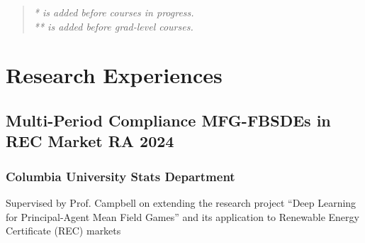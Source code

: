 \documentclass[a4paper]{article}
\begin{document}
\begin{quote}
    \itshape
    * is added before courses in progress.\\
    ** is added before grad-level courses.
\end{quote}

\section{Research Experiences}  %

\hypertarget{FBSDEs}{
    \subsection{Multi-Period Compliance MFG-FBSDEs in REC Market \normalfont \hfill RA \hfill 2024}}
    
\subsubsection{Columbia University Stats Department}
\vspace{3pt}
\begin{adjustwidth}{10pt}{}
    Supervised by Prof. Campbell on extending the research project “Deep Learning for Principal-Agent Mean Field Games” and its application to Renewable Energy Certificate (REC) markets
\end{adjustwidth}
\end{document}
